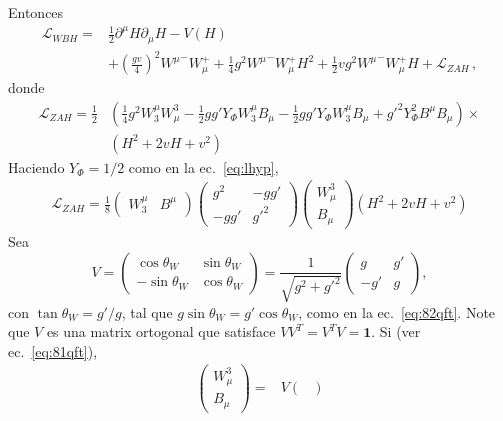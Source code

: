 \begin{frame}

Entonces
\begin{align}
  \label{eq:96qft}
  \mathcal{L}_{WBH}=&\frac{1}{2}\partial^\mu H\partial_\mu H-V(H)\nonumber\\
  &+\left(\frac{gv}{4}\right)^2{W^\mu}^-W_\mu^++\frac{1}{4}g^2{W^\mu}^-W_\mu^+H^2+\frac{1}{2}vg^2{W^\mu}^-W_\mu^+H+\mathcal{L}_{Z A H}\,,
\end{align}
donde
\begin{align}
  \mathcal{L}_{ZAH}=\frac{1}{2}&\left(\tfrac{1}{4}g^2W_3^\mu W^3_\mu-\tfrac{1}{2}gg'Y_\Phi W_3^\mu B_\mu-\tfrac{1}{2}gg'Y_\Phi W_3^\mu B_\mu+{g'}^2Y_\Phi ^2B^\mu B_\mu\right)\times\nonumber\\
&\left(H^2+2vH+v^2\right)
\end{align}
Haciendo $Y_\Phi =1/2$ como en la ec.~\eqref{eq:lhyp},
\begin{align}
  \mathcal{L}_{ZAH}=\frac{1}{8}
  \begin{pmatrix}
    W^\mu_3 & B^\mu
  \end{pmatrix}
  \begin{pmatrix}
    g^2&-gg'\\
    -gg'&{g'}^2
  \end{pmatrix}
  \begin{pmatrix}
    W^3_\mu\\
    B_\mu
  \end{pmatrix}
\left(H^2+2vH+v^2\right)
\end{align}
Sea
\begin{equation}
  V=\begin{pmatrix}
    \cos\theta_W & \sin\theta_W\\
    -\sin\theta_W& \cos\theta_W
  \end{pmatrix}=
  \frac{1}{\sqrt{g^2+{g'}^2}}\begin{pmatrix}
    g   & g'\\
    -g' & g
  \end{pmatrix},
\end{equation}
con $\tan\theta_W=g'/g$, tal que $g\sin\theta_W=g'\cos\theta_W$, como en la ec.~\eqref{eq:82qft}. Note que $V$ es una matrix ortogonal que satisface $VV^T=V^TV=\mathbf{1}$. Si (ver ec.~\eqref{eq:81qft}),
\begin{align}
  \begin{pmatrix}
    W^3_\mu\\
    B_\mu
  \end{pmatrix}=&V
  \begin{pmatrix}

\end{pmatrix}
\end{align}
\end{frame}
